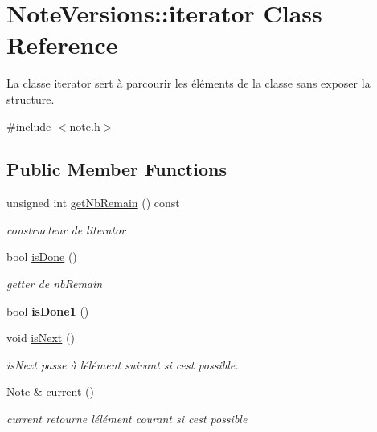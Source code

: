\hypertarget{classNoteVersions_1_1iterator}{}\section{Note\+Versions\+:\+:iterator Class Reference}
\label{classNoteVersions_1_1iterator}


La classe iterator sert à parcourir les éléments de la classe sans exposer la structure.  




{\ttfamily \#include $<$note.\+h$>$}

\subsection*{Public Member Functions}
\begin{DoxyCompactItemize}
\item 
\mbox{\label{classNoteVersions_1_1iterator_ab47ad2f61d11e6b7d2a0db1fdc49e20a}} 
unsigned int \hyperlink{classNoteVersions_1_1iterator_ab47ad2f61d11e6b7d2a0db1fdc49e20a}{get\+Nb\+Remain} () const
\begin{DoxyCompactList}\small\item\em constructeur de l\textquotesingle{}iterator \end{DoxyCompactList}\item 
bool \hyperlink{classNoteVersions_1_1iterator_a981d1e3329e25ef490506907839b7ce8}{is\+Done} ()
\begin{DoxyCompactList}\small\item\em getter de nb\+Remain \end{DoxyCompactList}\item 
\mbox{\label{classNoteVersions_1_1iterator_ae1b0c335d1af0916a2aacbc742016f96}} 
bool {\bfseries is\+Done1} ()
\item 
\mbox{\label{classNoteVersions_1_1iterator_ae5942b37e9d2d385fdebc6668e3b9f5e}} 
void \hyperlink{classNoteVersions_1_1iterator_ae5942b37e9d2d385fdebc6668e3b9f5e}{is\+Next} ()
\begin{DoxyCompactList}\small\item\em is\+Next passe à l\textquotesingle{}élément suivant si c\textquotesingle{}est possible. \end{DoxyCompactList}\item 
\hyperlink{classNote}{Note} \& \hyperlink{classNoteVersions_1_1iterator_a564a1e530f36e8eecdbece8b64c100e1}{current} ()
\begin{DoxyCompactList}\small\item\em current retourne l\textquotesingle{}élément courant si c\textquotesingle{}est possible \end{DoxyCompactList}\end{DoxyCompactItemize}
